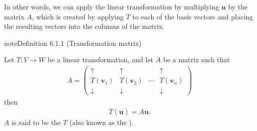 \documentclass[letterpaper,10pt,english]{jupyterBook}
\begin{document}
\sphinxAtStartPar
In other words, we can apply the linear transformation by multiplying \(\mathbf{u}\) by the matrix \(A\), which is created by applying \(T\) to each of the basis vectors and placing the resulting vectors into the columns of the matrix.
\label{_pages/6.1_Transformation_matrices:transformation-matrix-definition}
\begin{sphinxadmonition}{note}{Definition 6.1.1 (Transformation matrix)}



\sphinxAtStartPar
Let \(T : V \to W\) be a linear transformation, and let \(A\) be a matrix such that
\begin{equation*}
\begin{split} A = \begin{pmatrix}
    \uparrow & \uparrow & & \uparrow \\
    T(\mathbf{v}_1) & T(\mathbf{v}_2) & \cdots & T(\mathbf{v}_n) \\
    \downarrow & \downarrow & & \downarrow
\end{pmatrix} \end{split}
\end{equation*}
\sphinxAtStartPar
then
\begin{equation*}
\begin{split} T(\mathbf{u}) = A\mathbf{u}. \end{split}
\end{equation*}
\sphinxAtStartPar
\(A\) is said to be the  \(T\) (also known as the ).
\end{sphinxadmonition}
\label{_pages/6.1_Transformation_matrices:transformation-matrix-example}
\end{document}
